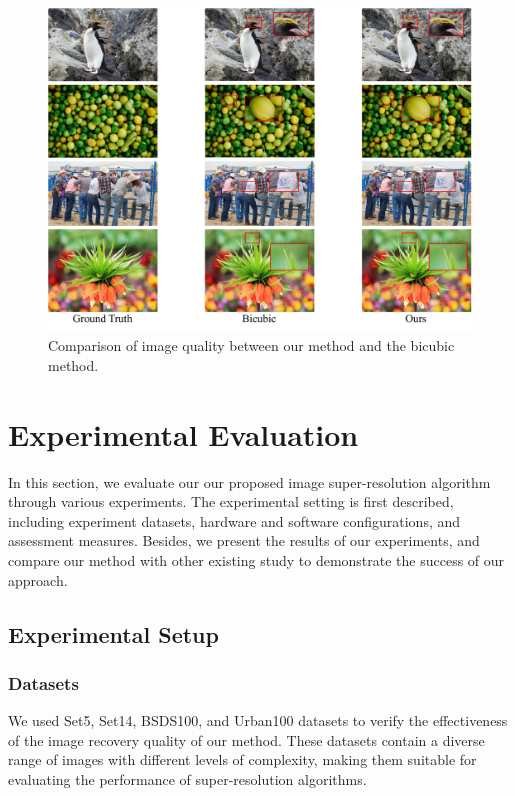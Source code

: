 \documentclass[10pt,twocolumn,letterpaper]{article}
\begin{document}
\begin{figure}[t]
    \begin{center}
    \includegraphics[width=\textwidth]{../x4result.pdf}
    \end{center}
    \caption{Comparison of image quality between our method and the bicubic method.}
    \label{yolov3}
\end{figure}

\section{Experimental Evaluation}
In this section, we evaluate our our proposed image super-resolution algorithm through various experiments. The experimental setting is first described, including experiment datasets, hardware and software configurations, and assessment measures. Besides, we present the results of our experiments, and compare our method with other existing study to demonstrate the success of our approach.

\subsection{Experimental Setup}

\subsubsection{Datasets}
We used Set5, Set14, BSDS100, and Urban100 datasets to verify the effectiveness of the image recovery quality of our method. These datasets contain a diverse range of images with different levels of complexity, making them suitable for evaluating the performance of super-resolution algorithms.
\end{document}
